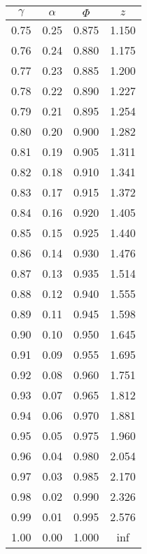 \begin{tabular}{|c|c|c|c|}\hline
$\gamma$ & $\alpha$ & $\Phi$ & $z$ \\ \hline
0.75 & 0.25 & 0.875 & 1.150\\
0.76 & 0.24 & 0.880 & 1.175\\
0.77 & 0.23 & 0.885 & 1.200\\
0.78 & 0.22 & 0.890 & 1.227\\
0.79 & 0.21 & 0.895 & 1.254\\
0.80 & 0.20 & 0.900 & 1.282\\
0.81 & 0.19 & 0.905 & 1.311\\
0.82 & 0.18 & 0.910 & 1.341\\
0.83 & 0.17 & 0.915 & 1.372\\
0.84 & 0.16 & 0.920 & 1.405\\
0.85 & 0.15 & 0.925 & 1.440\\
0.86 & 0.14 & 0.930 & 1.476\\
0.87 & 0.13 & 0.935 & 1.514\\
0.88 & 0.12 & 0.940 & 1.555\\
0.89 & 0.11 & 0.945 & 1.598\\
0.90 & 0.10 & 0.950 & 1.645\\
0.91 & 0.09 & 0.955 & 1.695\\
0.92 & 0.08 & 0.960 & 1.751\\
0.93 & 0.07 & 0.965 & 1.812\\
0.94 & 0.06 & 0.970 & 1.881\\
0.95 & 0.05 & 0.975 & 1.960\\
0.96 & 0.04 & 0.980 & 2.054\\
0.97 & 0.03 & 0.985 & 2.170\\
0.98 & 0.02 & 0.990 & 2.326\\
0.99 & 0.01 & 0.995 & 2.576\\
1.00 & 0.00 & 1.000 & inf\\
\hline \end{tabular}

\columnbreak

